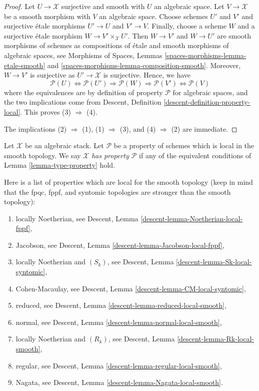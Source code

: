 \begin{proof}
Let $U \to \mathcal{X}$ surjective and smooth with $U$ an algebraic space.
Let $V \to \mathcal{X}$ be a smooth morphism with $V$ an algebraic space.
Choose schemes $U'$ and $V'$ and surjective \'etale morphisms
$U' \to U$ and $V' \to V$. Finally, choose a scheme $W$ and a
surjective \'etale morphism $W \to V' \times_{\mathcal{X}} U'$.
Then $W \to V'$ and $W \to U'$ are smooth morphisms of schemes
as compositions of \'etale and smooth morphisms of algebraic spaces, see
Morphisms of Spaces, Lemmas \ref{spaces-morphisms-lemma-etale-smooth} and
\ref{spaces-morphisms-lemma-composition-smooth}.
Moreover, $W \to V'$ is surjective as $U' \to \mathcal{X}$ is surjective.
Hence, we have
$$
\mathcal{P}(U) \Leftrightarrow
\mathcal{P}(U') \Rightarrow
\mathcal{P}(W) \Rightarrow
\mathcal{P}(V') \Leftrightarrow \mathcal{P}(V)
$$
where the equivalences are by definition of property $\mathcal{P}$ for
algebraic spaces, and the two implications come from
Descent, Definition \ref{descent-definition-property-local}.
This proves (3) $\Rightarrow$ (4).

\medskip\noindent
The implications (2) $\Rightarrow$ (1), (1) $\Rightarrow$ (3),
and (4) $\Rightarrow$ (2) are immediate.
\end{proof}

\begin{definition}
\label{definition-type-property}
Let $\mathcal{X}$ be an algebraic stack.
Let $\mathcal{P}$ be a property of schemes which is 
local in the smooth topology.
We say $\mathcal{X}$ {\it has property $\mathcal{P}$}
if any of the equivalent conditions of
Lemma \ref{lemma-type-property}
hold.
\end{definition}

\begin{remark}
\label{remark-list-properties-local-smooth-topology}
Here is a list of properties which are local for the smooth topology
(keep in mind that the fpqc, fppf, and syntomic topologies are
stronger than the smooth topology):
\begin{enumerate}
\item locally Noetherian, see
Descent, Lemma \ref{descent-lemma-Noetherian-local-fppf},
\item Jacobson, see
Descent, Lemma \ref{descent-lemma-Jacobson-local-fppf},
\item locally Noetherian and $(S_k)$, see
Descent, Lemma \ref{descent-lemma-Sk-local-syntomic},
\item Cohen-Macaulay, see
Descent, Lemma \ref{descent-lemma-CM-local-syntomic},
\item reduced, see
Descent, Lemma \ref{descent-lemma-reduced-local-smooth},
\item normal, see
Descent, Lemma \ref{descent-lemma-normal-local-smooth},
\item locally Noetherian and $(R_k)$, see
Descent, Lemma \ref{descent-lemma-Rk-local-smooth},
\item regular, see
Descent, Lemma \ref{descent-lemma-regular-local-smooth},
\item Nagata, see
Descent, Lemma \ref{descent-lemma-Nagata-local-smooth}.
\end{enumerate}
\end{remark}

